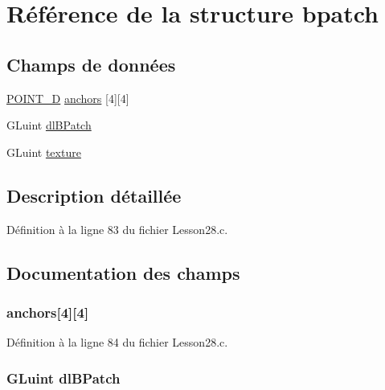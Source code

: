 \hypertarget{structbpatch}{}\section{Référence de la structure bpatch}
\label{structbpatch}
\subsection*{Champs de données}
\begin{DoxyCompactItemize}
\item 
\hyperlink{_lesson28_8c_a45fa27a4c8fe194f28d88475f2bbe341}{P\+O\+I\+N\+T\+\_\+D} \hyperlink{structbpatch_a50cd3e8af8b82b60ff71278f99bf6f1b}{anchors} \mbox{[}4\mbox{]}\mbox{[}4\mbox{]}
\item 
G\+Luint \hyperlink{structbpatch_a85f84737c0d2322ccba76c3e9d1eb242}{dl\+B\+Patch}
\item 
G\+Luint \hyperlink{structbpatch_a0704dfe56dec926cb35f7bdc0834ecd0}{texture}
\end{DoxyCompactItemize}


\subsection{Description détaillée}


Définition à la ligne 83 du fichier Lesson28.\+c.



\subsection{Documentation des champs}
\hypertarget{structbpatch_a50cd3e8af8b82b60ff71278f99bf6f1b}{}
\subsubsection[{anchors}]{ anchors\mbox{[}4\mbox{]}\mbox{[}4\mbox{]}}\label{structbpatch_a50cd3e8af8b82b60ff71278f99bf6f1b}


Définition à la ligne 84 du fichier Lesson28.\+c.

\hypertarget{structbpatch_a85f84737c0d2322ccba76c3e9d1eb242}{}
\subsubsection[{dl\+B\+Patch}]{\setlength{\rightskip}{0pt plus 5cm}G\+Luint dl\+B\+Patch}\label{structbpatch_a85f84737c0d2322ccba76c3e9d1eb242}


